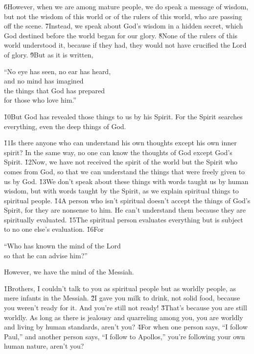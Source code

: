 \v{6}However, when we are among mature people, we do speak a message of wisdom, but not the wisdom of this world or of the rulers of this world, who are passing off the scene. \v{7}Instead, we speak about God's wisdom in a hidden secret, which God destined before the world began for our glory. \v{8}None of the rulers of this world understood it, because if they had, they would not have crucified the Lord of glory. \v{9}But as it is written,

\begin{poetry}
\poeml ``No eye has seen, no ear has heard, \\
\poemll    and no mind has imagined \\
\poeml the things that God has prepared \\
\poemll    for those who love him.''
\end{poetry}

\v{10}But God has revealed those things to us by his Spirit. For the Spirit searches everything, even the deep things of God.

\v{11}Is there anyone who can understand his own thoughts except his own inner spirit? In the same way, no one can know the thoughts of God except God's Spirit. \v{12}Now, we have not received the spirit of the world but the Spirit who comes from God, so that we can understand the things that were freely given to us by God. \v{13}We don't speak about these things with words taught us by human wisdom, but with words taught by the Spirit, as we explain spiritual things to spiritual people. \v{14}A person who isn't spiritual doesn't accept the things of God's Spirit, for they are nonsense to him. He can't understand them because they are spiritually evaluated. \v{15}The spiritual person evaluates everything but is subject to no one else's evaluation. \v{16}For

\begin{poetry}
\poeml ``Who has known the mind of the Lord \\
\poemll    so that he can advise him?''
\end{poetry}

However, we have the mind of the Messiah.

\v{1}Brothers, I couldn't talk to you as spiritual people but as worldly people, as mere infants in the Messiah. \v{2}I gave you milk to drink, not solid food, because you weren't ready for it. And you're still not ready! \v{3}That's because you are still worldly. As long as there is jealousy and quarreling among you, you are worldly and living by human standards, aren't you? \v{4}For when one person says, ``I follow Paul,'' and another person says, ``I follow to Apollos,'' you're following your own human nature, aren't you?

